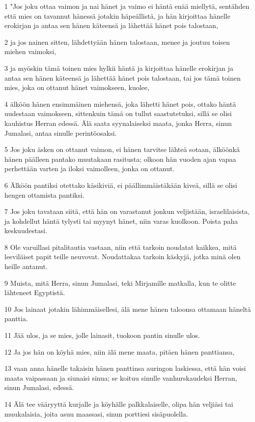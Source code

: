 \par 1 "Jos joku ottaa vaimon ja nai hänet ja vaimo ei häntä enää miellytä, sentähden että mies on tavannut hänessä jotakin häpeällistä, ja hän kirjoittaa hänelle erokirjan ja antaa sen hänen käteensä ja lähettää hänet pois talostaan,
\par 2 ja jos nainen sitten, lähdettyään hänen talostaan, menee ja joutuu toisen miehen vaimoksi,
\par 3 ja myöskin tämä toinen mies hylkii häntä ja kirjoittaa hänelle erokirjan ja antaa sen hänen käteensä ja lähettää hänet pois talostaan, tai jos tämä toinen mies, joka on ottanut hänet vaimokseen, kuolee,
\par 4 älköön hänen ensimmäinen miehensä, joka lähetti hänet pois, ottako häntä uudestaan vaimokseen, sittenkuin tämä on tullut saastutetuksi, sillä se olisi kauhistus Herran edessä. Älä saata syynalaiseksi maata, jonka Herra, sinun Jumalasi, antaa sinulle perintöosaksi.
\par 5 Jos joku äsken on ottanut vaimon, ei hänen tarvitse lähteä sotaan, älköönkä hänen päälleen pantako muutakaan rasitusta; olkoon hän vuoden ajan vapaa perhettään varten ja iloksi vaimolleen, jonka on ottanut.
\par 6 Älköön pantiksi otettako käsikiviä, ei päällimmäistäkään kiveä, sillä se olisi hengen ottamista pantiksi.
\par 7 Jos joku tavataan siitä, että hän on varastanut jonkun veljistään, israelilaisista, ja kohdellut häntä tylysti tai myynyt hänet, niin varas kuolkoon. Poista paha keskuudestasi.
\par 8 Ole varuillasi pitalitautia vastaan, niin että tarkoin noudatat kaikkea, mitä leeviläiset papit teille neuvovat. Noudattakaa tarkoin käskyjä, jotka minä olen heille antanut.
\par 9 Muista, mitä Herra, sinun Jumalasi, teki Mirjamille matkalla, kun te olitte lähteneet Egyptistä.
\par 10 Jos lainaat jotakin lähimmäisellesi, älä mene hänen taloonsa ottamaan häneltä panttia.
\par 11 Jää ulos, ja se mies, jolle lainasit, tuokoon pantin sinulle ulos.
\par 12 Ja jos hän on köyhä mies, niin älä mene maata, pitäen hänen panttiansa,
\par 13 vaan anna hänelle takaisin hänen panttinsa auringon laskiessa, että hän voisi maata vaipassaan ja siunaisi sinua; se koituu sinulle vanhurskaudeksi Herran, sinun Jumalasi, edessä.
\par 14 Älä tee vääryyttä kurjalle ja köyhälle palkkalaiselle, olipa hän veljiäsi tai muukalaisia, joita asuu maassasi, sinun porttiesi sisäpuolella.
